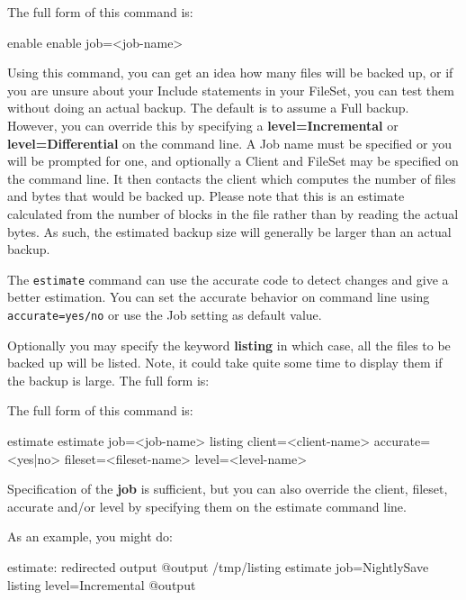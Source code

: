 \begin{description}
   The full form of this command is:

\begin{bconsole}{enable}
enable job=<job-name>
\end{bconsole}

\label{estimate}
\item [estimate]
   Using this command, you can get an idea how many files will be backed
   up, or if you are unsure about your Include statements in your FileSet,
   you can test them without doing an actual backup.  The default is to
   assume a Full backup.  However, you can override this by specifying a
   {\bf level=Incremental} or {\bf level=Differential} on the command line.
   A Job name must be specified or you will be prompted for one, and
   optionally a Client and FileSet may be specified on the command line.
   It then contacts the client which computes the number of files and bytes
   that would be backed up.  Please note that this is an estimate
   calculated from the number of blocks in the file rather than by reading
   the actual bytes.  As such, the estimated backup size will generally be
   larger than an actual backup.

   The \texttt{estimate} command can use the accurate code to detect changes
   and give a better estimation. You can set the accurate behavior on command
   line using \texttt{accurate=yes/no} or use the Job setting as default value.

   Optionally you may specify the keyword {\bf listing} in  which case, all the
   files to be backed up will be listed.  Note, it could take quite some time to
   display them if the  backup is large. The full form is:

   The full form of this command is:

\begin{bconsole}{estimate}
estimate job=<job-name> listing client=<client-name> accurate=<yes|no> fileset=<fileset-name> level=<level-name>
\end{bconsole}

   Specification of the {\bf job} is sufficient, but you can also override the
   client, fileset, accurate and/or level by specifying them on the estimate
   command line.

As an example, you might do:

\begin{bconsole}{estimate: redirected output}
@output /tmp/listing
estimate job=NightlySave listing level=Incremental
@output
\end{bconsole}


\end{description}
